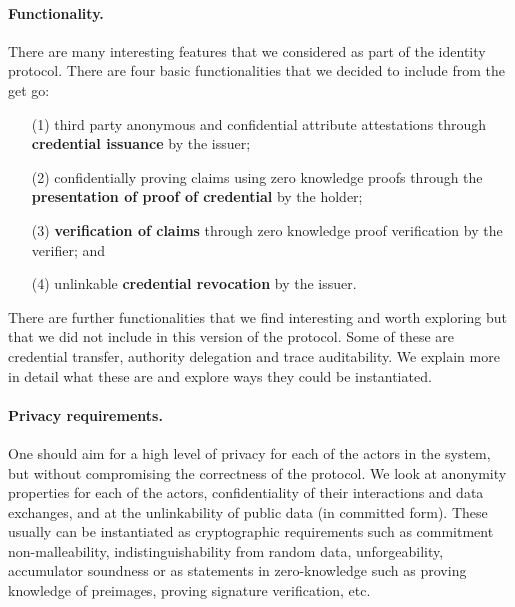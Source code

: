 \paragraph{Functionality.}
There are many interesting features that we considered as part of the identity protocol. 
There are four basic functionalities that we decided to include from the get go: 
\begin{itemize}
\item[(1)] third party anonymous and confidential attribute attestations through \textbf{credential issuance} by the issuer;
\item[(2)] confidentially proving claims using zero knowledge proofs through the \textbf{presentation of proof of credential} by the holder;
\item[(3)] \textbf{verification of claims} through zero knowledge proof verification by the verifier; and
\item[(4)] unlinkable \textbf{credential revocation} by the issuer. 
\end{itemize}

There are further functionalities that we find interesting and worth exploring but that we did not include in this version of the protocol. 
Some of these are credential transfer, authority delegation and trace auditability. We explain more in detail what these are and explore ways they could be instantiated. 


\paragraph{Privacy requirements.}
One should aim for a high level of privacy for each of the actors in the system, but without compromising the correctness of the protocol. We look at anonymity properties for each of the actors, confidentiality of their interactions and data exchanges, and at the unlinkability of public data (in committed form). These usually can be instantiated as cryptographic requirements such as commitment non-malleability, indistinguishability from random data, unforgeability, accumulator soundness or as statements in zero-knowledge such as proving knowledge of preimages, proving signature verification, etc.

